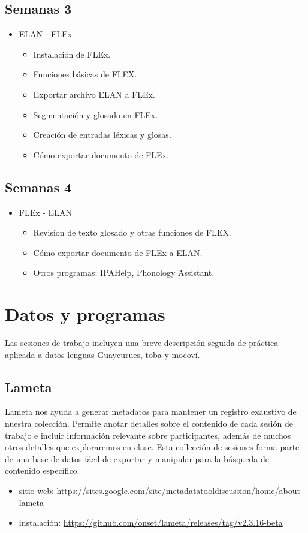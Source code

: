 \documentclass[12pt]{article}
\begin{document}
\subsection*{Semanas 3}
\begin{itemize}
\item ELAN - FLEx
\begin{itemize}
\item Instalación de FLEx. 
\item Funciones básicas de FLEX. 
\item Exportar archivo ELAN a FLEx.
\item Segmentación y glosado en FLEx. 
\item Creación de entradas léxicas y glosas.
\item Cómo exportar documento de FLEx.
\end{itemize}
\end{itemize}
\subsection*{Semanas 4}
 
\begin{itemize}
\item FLEx - ELAN
\begin{itemize}
\item Revision de texto glosado y otras funciones de FLEX.
\item Cómo exportar documento de FLEx a ELAN.
\item Otros programas: IPAHelp, Phonology Assistant.
\end{itemize}
\end{itemize}


\section{Datos y programas}
Las sesiones de trabajo incluyen una breve descripción seguida de práctica aplicada a datos lenguas Guaycurues, toba y mocoví.

\subsection{Lameta}
Lameta \citep{hatton.etal2021} nos ayuda a generar metadatos para mantener un registro exaustivo de nuestra colección. Permite anotar detalles sobre el contenido de cada sesión de trabajo e incluir información relevante sobre participantes, además de muchos otros detalles que exploraremos en clase. Esta collección de sesiones forma parte de una base de datos fácil de exportar y manipular para la búsqueda de contenido específico.
\begin{itemize}
\item sitio web: \url{https://sites.google.com/site/metadatatooldiscussion/home/about-lameta}
\item instalación: \url{https://github.com/onset/lameta/releases/tag/v2.3.16-beta} 
\end{itemize}
\end{document}
